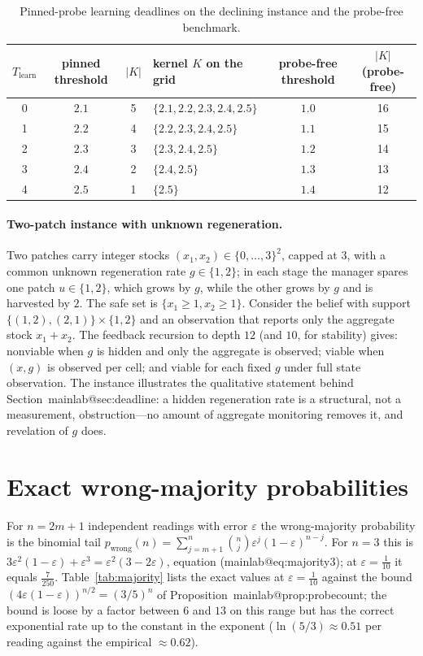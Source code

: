 \documentclass[11pt,a4paper]{article}
\makeatletter
\theoremstyle{plain}
\theoremstyle{definition}
\theoremstyle{remark}
\newcommand{\Tl}{T_{\mathrm{learn}}}
\newcommand{\tfr}[2]{\tfrac{#1}{#2}}
\newcommand{\mref}[1]{\csname mainlab@#1\endcsname}
\newcommand{\meqref}[1]{(\mref{#1})}
\makeatother
\begin{document}
\begin{table}[h]
\centering\footnotesize
\caption{Pinned-probe learning deadlines on the declining instance and the probe-free benchmark.}
\label{tab:deadline}
\begin{tabular}{@{}c c c l c c@{}}
\toprule
$\Tl$ & pinned threshold & $|K|$ & kernel $K$ on the grid & probe-free threshold & $|K|$ (probe-free)\\
\midrule
0 & $2.1$ & 5 & $\{2.1, 2.2, 2.3, 2.4, 2.5\}$ & $1.0$ & 16\\
1 & $2.2$ & 4 & $\{2.2, 2.3, 2.4, 2.5\}$ & $1.1$ & 15\\
2 & $2.3$ & 3 & $\{2.3, 2.4, 2.5\}$ & $1.2$ & 14\\
3 & $2.4$ & 2 & $\{2.4, 2.5\}$ & $1.3$ & 13\\
4 & $2.5$ & 1 & $\{2.5\}$ & $1.4$ & 12\\
\bottomrule
\end{tabular}
\end{table}

\paragraph{Two-patch instance with unknown regeneration.} Two patches carry integer stocks $(x_1,x_2)\in\{0,\dots,3\}^2$, capped at $3$, with a common unknown regeneration rate $g\in\{1,2\}$; in each stage the manager spares one patch $u\in\{1,2\}$, which grows by $g$, while the other grows by $g$ and is harvested by $2$. The safe set is $\{x_1\ge1,x_2\ge1\}$. Consider the belief with support $\{(1,2),(2,1)\}\times\{1,2\}$ and an observation that reports only the aggregate stock $x_1+x_2$. The feedback recursion to depth $12$ (and $10$, for stability) gives: nonviable when $g$ is hidden and only the aggregate is observed; viable when $(x,g)$ is observed per cell; and viable for each fixed $g$ under full state observation. The instance illustrates the qualitative statement behind Section~\mref{sec:deadline}: a hidden regeneration rate is a structural, not a measurement, obstruction---no amount of aggregate monitoring removes it, and revelation of $g$ does.
\section{Exact wrong-majority probabilities}\label{si:majority}

For $n=2m+1$ independent readings with error $\varepsilon$ the wrong-majority probability is the binomial tail $p_{\mathrm{wrong}}(n)=\sum_{j=m+1}^{n}\binom nj\varepsilon^{j}(1-\varepsilon)^{n-j}$. For $n=3$ this is $3\varepsilon^2(1-\varepsilon)+\varepsilon^3=\varepsilon^2(3-2\varepsilon)$, equation \meqref{eq:majority3}; at $\varepsilon=\tfr1{10}$ it equals $\tfr{7}{250}$. Table~\ref{tab:majority} lists the exact values at $\varepsilon=\tfr1{10}$ against the bound $(4\varepsilon(1-\varepsilon))^{n/2}=(3/5)^n$ of Proposition~\mref{prop:probecount}; the bound is loose by a factor between $6$ and $13$ on this range but has the correct exponential rate up to the constant in the exponent ($\ln(5/3)\approx0.51$ per reading against the empirical $\approx0.62$).
\end{document}
